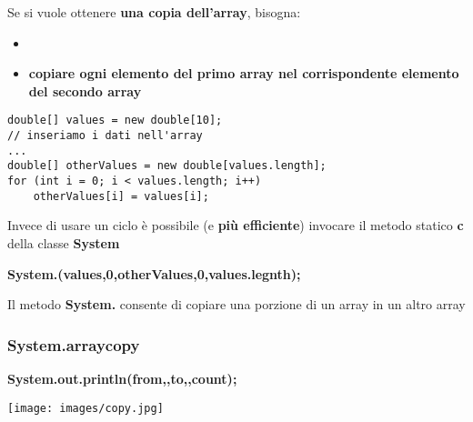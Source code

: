 \begin{frame}[fragile]
\begin{block}{}
Se si vuole ottenere \textbf{una copia dell'array}, bisogna:
\begin{itemize}
\item \textbf{}
\item \textbf{copiare ogni elemento del primo array nel corrispondente elemento del secondo array}
\end{itemize}
\end{block}
\begin{lstlisting}
double[] values = new double[10];
// inseriamo i dati nell'array
...
double[] otherValues = new double[values.length];
for (int i = 0; i < values.length; i++)
    otherValues[i] = values[i];
\end{lstlisting}
\end{frame}

\begin{frame}
\begin{block}{}
Invece di usare un ciclo è possibile (e \textbf{più efficiente}) invocare il metodo statico 
\textbf{\alert{c}} della classe \textbf{\alert{System}}
\end{block}
\hspace{0.9cm}\textbf{\alert{System}.(values,0,otherValues,0,values.legnth);}
\begin{block}{}
Il metodo \textbf{\alert{System}.} consente di copiare una porzione di un array in un altro array
\end{block}
\end{frame}

\begin{frame}
\frametitle{System.arraycopy}
\begin{block}{}
\textbf{System.out.println(\alert{from},,\alert{to},,count);}
\end{block}
\centering
\texttt{[image: images/copy.jpg]}
\end{frame}

